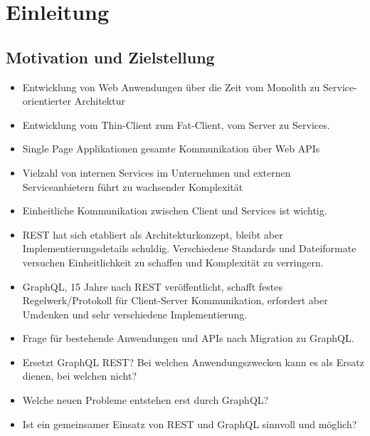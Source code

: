 \section{Einleitung}

\subsection{Motivation und Zielstellung}
\begin{itemize}
  \item Entwicklung von Web Anwendungen über die Zeit vom Monolith zu Service-orientierter Architektur
  \item Entwicklung vom Thin-Client zum Fat-Client, vom Server zu Services.
  \item Single Page Applikationen gesamte Kommunikation über Web APIs
  \item Vielzahl von internen Services im Unternehmen und externen Serviceanbietern führt zu wachsender Komplexität
  \item Einheitliche Kommunikation zwischen Client und Services ist wichtig.
  \item REST hat sich etabliert als Architekturkonzept, bleibt aber Implementierungsdetails schuldig. Verschiedene Standards und Dateiformate versuchen Einheitlichkeit zu schaffen und Komplexität zu verringern.
  \item GraphQL, 15 Jahre nach REST veröffentlicht, schafft festes Regelwerk/Protokoll für Client-Server Kommunikation, erfordert aber Umdenken und sehr verschiedene Implementierung.
  \item Frage für bestehende Anwendungen und APIs nach Migration zu GraphQL\@.
  \item Ersetzt GraphQL REST\@? Bei welchen Anwendungszwecken kann es als Ersatz dienen, bei welchen nicht?
  \item Welche neuen Probleme entstehen erst durch GraphQL\@?
  \item Ist ein gemeinsamer Einsatz von REST und GraphQL sinnvoll und möglich?
\end{itemize}
